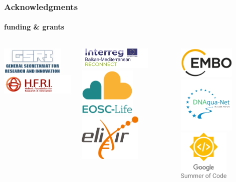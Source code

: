 \documentclass{beamer}
\begin{document}
   \begin{frame}
      \frametitle{Acknowledgments}
      \framesubtitle{funding \& grants}

      \begin{columns}[onlytextwidth]

            \includegraphics[width=30mm]{resources/thumbnail_gsri_logo_v2-en.png}
            \includegraphics[width=40mm]{resources/elidek_logo_en.png}
   
            \includegraphics[width=35mm]{resources/Acronym_Environment_RECONNECT_transp.png}
            \includegraphics[width=27mm]{resources/eosclogo.png}
            \includegraphics[width=30mm]{resources/Elixir-Europe-logo-1.png}

            \includegraphics[width=27mm]{resources/embo_logo.png}
            \includegraphics[width=27mm]{resources/dnaquanet.png}
            \includegraphics[width=24mm]{resources/GSoC_logo.svg.png}

      \end{columns}

   \end{frame}
\end{document}
